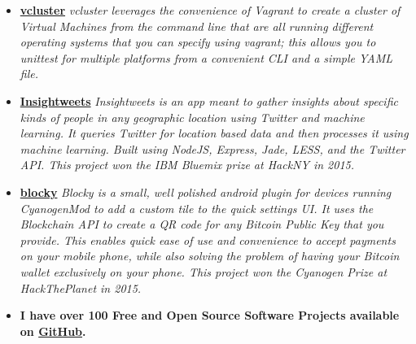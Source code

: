 \documentclass[12pt,a4paper,sans]{moderncv}
\begin{document}
\begin{itemize}

\item{\textbf{\href{https://github.com/davidawad/vcluster}{vcluster}}\textit{ vcluster leverages the convenience of Vagrant to create a cluster of Virtual Machines from the command line that are all running different operating systems that you can specify using vagrant; this allows you to unittest for multiple platforms from a convenient CLI and a simple YAML file.}}
\vspace{5pt}

\iffalse 
\item{\textbf{\href{http://github.com/davidawad/Quantum-Simulator}{Quantum Simulator}} \textit{ I currently maintain a quantum computation simulator written in python to replicate the effects of quantum logical gates on quantum bits in order to asses changes in amplitudes and experiment on quantum algorithms.}}
\vspace{5pt}
\fi

\item{\textbf{\href{http://insightweets.mybluemix.net/landing}{Insightweets}}\textit{ Insightweets is an app meant to gather insights about specific kinds of people in any geographic location using Twitter and machine learning. It queries Twitter for location based data and then processes it using machine learning. Built using NodeJS, Express, Jade, LESS, and the Twitter API. This project won the IBM Bluemix prize at HackNY in 2015.}}
\vspace{5pt}

\item{\textbf{\href{http://github.com/davidawad/blocky}{blocky}} \textit{ 
Blocky is a small, well polished android plugin for devices running CyanogenMod to add a custom tile to the quick settings UI. It uses the Blockchain API to create a QR code for any Bitcoin Public Key that you provide. This enables quick ease of use and convenience to accept payments on your mobile phone, while also solving the problem of having your Bitcoin wallet exclusively on your phone. This project won the Cyanogen Prize at HackThePlanet in 2015.
}}

\vspace{5pt}

\item{\textbf{I have over 100 Free and Open Source Software Projects available on \href{https://github.com/davidawad}{GitHub}.}}

\end{itemize}
\end{document}
